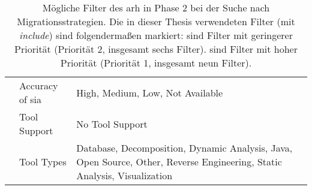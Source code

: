 \begin{table}
\begin{tabular}{m{2cm} m{2cm} m{9cm}}
    & Accuracy of \gls{sia} & High, Medium, Low, Not Available \\ \cline{2-3}
    & Tool Support & No Tool Support \\ \cline{2-3}
    & Tool Types & Database, Decomposition, Dynamic Analysis, Java, Open Source, Other, Reverse Engineering, Static Analysis, Visualization \\
    \bottomrule
  \end{tabular}
  \caption[Mögliche Filter des \gls{arh} in Phase 2]{
  	Mögliche Filter des \gls{arh} in Phase 2 bei der Suche nach Migrationsstrategien.
  	Die in dieser Thesis verwendeten Filter (mit \emph{include}) sind folgendermaßen markiert:
     sind Filter mit geringerer Priorität (Priorität 2, insgesamt sechs Filter).
     sind Filter mit hoher Priorität (Priorität 1, insgesamt neun Filter).
  }
  \label{tab:phase2-all-filter}
\end{table}
